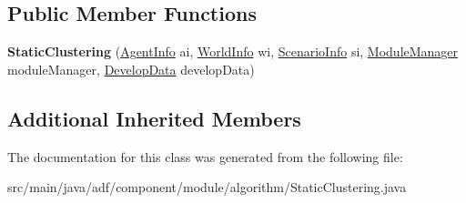 \subsection*{Public Member Functions}
\begin{DoxyCompactItemize}
\item 
\hypertarget{classadf_1_1component_1_1module_1_1algorithm_1_1StaticClustering_ab5d247783feee287d88f6ba353641d0b}{}\label{classadf_1_1component_1_1module_1_1algorithm_1_1StaticClustering_ab5d247783feee287d88f6ba353641d0b} 
{\bfseries Static\+Clustering} (\hyperlink{classadf_1_1agent_1_1info_1_1AgentInfo}{Agent\+Info} ai, \hyperlink{classadf_1_1agent_1_1info_1_1WorldInfo}{World\+Info} wi, \hyperlink{classadf_1_1agent_1_1info_1_1ScenarioInfo}{Scenario\+Info} si, \hyperlink{classadf_1_1agent_1_1module_1_1ModuleManager}{Module\+Manager} module\+Manager, \hyperlink{classadf_1_1agent_1_1develop_1_1DevelopData}{Develop\+Data} develop\+Data)
\end{DoxyCompactItemize}
\subsection*{Additional Inherited Members}


The documentation for this class was generated from the following file\+:\begin{DoxyCompactItemize}
\item 
src/main/java/adf/component/module/algorithm/Static\+Clustering.\+java\end{DoxyCompactItemize}
